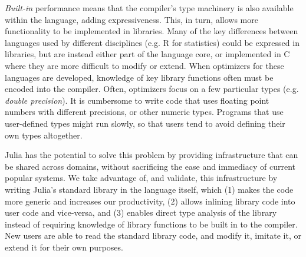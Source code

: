 \documentclass[9pt]{sigplanconf}
\begin{document}

{\it Built-in} performance means that the compiler's type machinery is
also available within the language, adding expressiveness. This, in
turn, allows more functionality to be implemented in libraries. Many
of the key differences between languages used by different disciplines
(e.g. R for statistics) could be expressed in libraries, but are
instead either part of the language core, or implemented in C where
they are more difficult to modify or extend. When optimizers for these
languages are developed, knowledge of key library functions often must
be encoded into the compiler. Often, optimizers focus on a few particular
types (e.g. {\it double precision}). It is cumbersome to write code that
uses floating point numbers with different precisions, or other
numeric types. Programs that use
user-defined types might run slowly, so that users tend to
avoid defining their own types altogether.


Julia has the potential to solve this problem by providing
infrastructure that can be shared across domains, without sacrificing
the ease and immediacy of current popular systems.  We take advantage
of, and validate, this infrastructure by writing Julia's standard
library in the language itself, which (1) makes the code more generic
and increases our productivity, (2) allows inlining library code into
user code and vice-versa, and (3) enables direct type analysis of the
library instead of requiring knowledge of library functions to be
built in to the compiler. New users are able to read the standard
library code, and modify it, imitate it, or extend it for their own
purposes.


\end{document}

